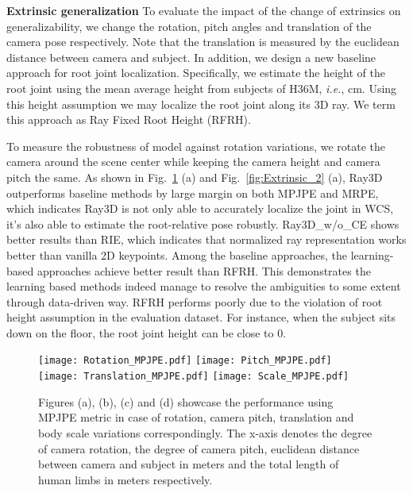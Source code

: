 \documentclass[10pt,twocolumn,letterpaper]{article}
\def\ie{\emph{i.e.}}
\begin{document}
\noindent\textbf{Extrinsic generalization}
To evaluate the impact of the change of extrinsics on generalizability, we change the rotation, pitch angles and translation of the camera pose respectively. Note that the translation is measured by the euclidean distance between camera and subject. In addition, we design a new baseline approach for root joint localization. Specifically, we estimate the height of the root joint using the mean average height from subjects of H36M, \ie, cm. Using this height assumption we may localize the root joint along its 3D ray. We term this approach as Ray Fixed Root Height (RFRH). 

To measure the robustness of model against rotation variations, we rotate the camera around the scene center while keeping the camera height and camera pitch the same. As shown in Fig.~\ref{fig:Extrinsic_1} (a) and Fig.~\ref{fig:Extrinsic_2} (a), Ray3D outperforms baseline methods by large margin on both MPJPE and MRPE, which indicates Ray3D is not only able to accurately localize the joint in WCS, it's also able to estimate the root-relative pose robustly. Ray3D\_w/o\_CE shows better results than RIE, which indicates that normalized ray representation works better than vanilla 2D keypoints. Among the baseline approaches, the learning-based approaches achieve better result than RFRH. This demonstrates the learning based methods indeed manage to resolve the ambiguities to some extent through data-driven way. RFRH performs poorly due to the violation of root height assumption in the evaluation dataset. For instance, when the subject sits down on the floor, the root joint height can be close to 0.

\begin{figure}
  \centering
  \texttt{[image: Rotation\_MPJPE.pdf]}
  \texttt{[image: Pitch\_MPJPE.pdf]}
  \texttt{[image: Translation\_MPJPE.pdf]}
  \texttt{[image: Scale\_MPJPE.pdf]}
  \vskip-9pt
  \caption{Figures (a), (b), (c) and (d) showcase the performance using MPJPE metric in case of rotation, camera pitch, translation and body scale variations correspondingly. The x-axis denotes the degree of camera rotation, the degree of camera pitch, euclidean distance between camera and subject in meters and the total length of human limbs in meters respectively.}
  \label{fig:Extrinsic_1}
  \vspace{-2mm}
\end{figure}
\end{document}
